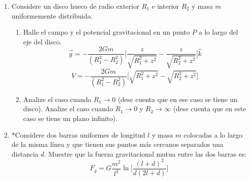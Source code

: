 \documentclass[11pt,twocolumn]{article}
\begin{document}
\begin{enumerate}
\item Considere un disco hueco de radio exterior $R_{1}$ e interior $R_{2}$ y masa $m$ uniformemente distribuida. 
\begin{enumerate}
\item Halle el campo y el potencial gravitacional en un punto $P$ a lo largo del eje del disco.
\begin{displaymath}
\vec{g}=-\dfrac{2Gm}{(R_{1}^2 -R_{2}^2)}\Big[\dfrac{z}{\sqrt{R_{1}^2 +z^2}}- \dfrac{z}{\sqrt{R_{2}^2 +z^2}}\Big]\hat{k}
\end{displaymath}
\begin{displaymath}
V= -\dfrac{2Gm}{(R_{1}^2 -R_{2}^2)}\Big[\sqrt{R_{1}^2 + z^2} - \sqrt{R_{2}^2 +z^2}\Big]
\end{displaymath}
\item Analize el caso cuando $R_{1} \to 0$ (dese cuenta que en ese caso se tiene un disco). Analize el caso cuando $R_{1} \to 0$ y $R_{2} \to \infty $ (dese cuenta que en este caso se tiene un plano infinito).
\end{enumerate}

\item *Considere dos barras uniformes de longitud $l$ y masa $m$ colocadas a lo largo de la misma línea y que tienen sus puntos más cercanos separados una distancia $d$. Muestre que la fuerza gravitacional mutua entre las dos barras es:
\begin{displaymath}
F_{g}= G\dfrac{m^2}{l^2} \ln \Big[\dfrac{(l+d)^2}{d(2l+d)}\Big]
\end{displaymath}  


\end{enumerate}
\end{document}
